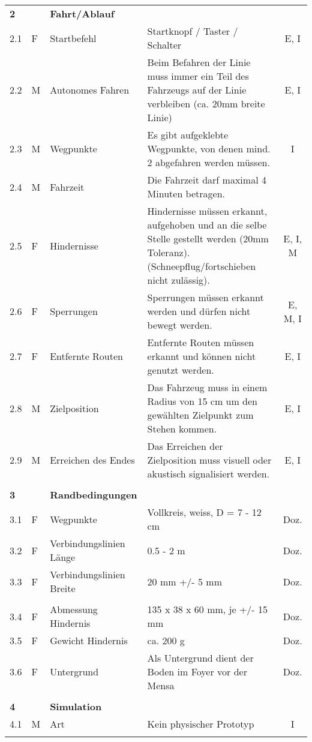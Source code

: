 \documentclass{article}
\begin{document}
\begin{landscape}
\begin{longtable}{llp{4cm}p{15cm}c}
        \textbf{2} &  & \textbf{Fahrt/Ablauf} & &   \\
        2.1 & F & Startbefehl & Startknopf / Taster / Schalter & E, I \\
        2.2 & M & Autonomes Fahren & Beim Befahren der Linie muss immer ein Teil des Fahrzeugs auf der Linie verbleiben (ca. 20mm breite Linie) & E, I \\
        2.3 & M & Wegpunkte & Es gibt aufgeklebte Wegpunkte, von denen mind. 2 abgefahren werden müssen. & I \\
        2.4 & M & Fahrzeit & Die Fahrzeit darf maximal 4 Minuten betragen. & \\
        2.5 & F & Hindernisse & Hindernisse müssen erkannt, aufgehoben und an die selbe Stelle gestellt werden (20mm Toleranz). (Schneepflug/fortschieben nicht zulässig). & E, I, M \\
        2.6 & F & Sperrungen & Sperrungen müssen erkannt werden und dürfen nicht bewegt werden. & E, M, I \\
        2.7 & F & Entfernte Routen & Entfernte Routen müssen erkannt und können nicht genutzt werden. & E, I \\
        2.8 & M & Zielposition & Das Fahrzeug muss in einem Radius von 15 cm um den gewählten Zielpunkt zum Stehen kommen. & E, I \\
        2.9 & M & Erreichen des Endes & Das Erreichen der Zielposition muss visuell oder akustisch signalisiert werden. & E, I \\

        \\
        \textbf{3} & & \textbf{Randbedingungen} \\
        3.1 & F & Wegpunkte & Vollkreis, weiss, D = 7 - 12 cm & Doz. \\
        3.2 & F & Verbindungslinien Länge & 0.5 - 2 m & Doz. \\
        3.3 & F & Verbindungslinien Breite & 20 mm +/- 5 mm & Doz. \\
        \\
        3.4 & F & Abmessung Hindernis & 135 x 38 x 60 mm, je +/- 15 mm & Doz. \\
        3.5 & F & Gewicht Hindernis & ca. 200 g & Doz. \\
        3.6 & F & Untergrund & Als Untergrund dient der Boden im Foyer vor der Mensa & Doz. \\

		\\
        \textbf{4} & & \textbf{Simulation} \\
        4.1 & M & Art & Kein physischer Prototyp & I \\
        \label{tab:my_label}
    \end{longtable}
\end{landscape} %
\end{document}
